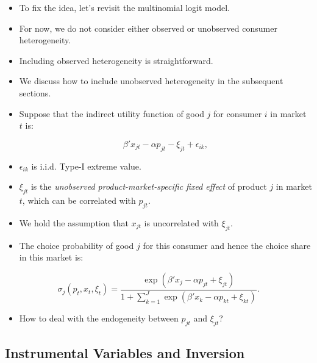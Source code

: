 \documentclass[]{book}
\providecommand{\tightlist}{%
  \setlength{\itemsep}{0pt}\setlength{\parskip}{0pt}}
\begin{document}
\begin{itemize}
\tightlist
\item
  To fix the idea, let's revisit the multinomial logit model.
\item
  For now, we do not consider either observed or unobserved consumer
  heterogeneity.
\item
  Including observed heterogeneity is straightforward.
\item
  We discuss how to include unobserved heterogeneity in the subsequent
  sections.
\item
  Suppose that the indirect utility function of good \(j\) for consumer
  \(i\) in market \(t\) is:

  \begin{equation}
  \beta' x_{jt}  - \alpha p_{jt} - \xi_{jt} + \epsilon_{ik},
  \end{equation}
\item
  \(\epsilon_{ik}\) is i.i.d. Type-I extreme value.
\item
  \(\xi_{jt}\) is the \emph{unobserved product-market-specific fixed
  effect} of product \(j\) in market \(t\), which can be correlated with
  \(p_{jt}\).
\item
  We hold the assumption that \(x_{jt}\) is uncorrelated with
  \(\xi_{jt}\).
\item
  The choice probability of good \(j\) for this consumer and hence the
  choice share in this market is:
\end{itemize}

\begin{equation}
\sigma_j(p_t, x_t, \xi_t) = \frac{\exp(\beta' x_j - \alpha p_{jt} + \xi_{jt})}{1 + \sum_{k = 1}^J\exp(\beta' x_k - \alpha p_{kt} +  \xi_{kt} ) }.
\end{equation}

\begin{itemize}
\tightlist
\item
  How to deal with the endogeneity between \(p_{jt}\) and \(\xi_{jt}\)?
\end{itemize}

\subsection{Instrumental Variables and
Inversion}\label{instrumental-variables-and-inversion}
\end{document}
